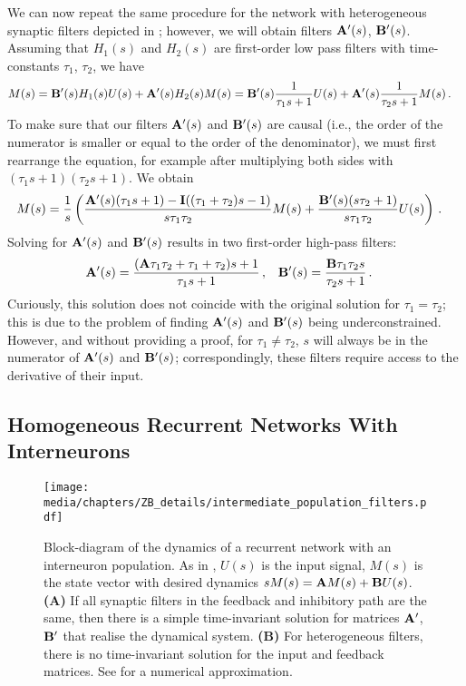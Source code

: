We can now repeat the same procedure for the network with heterogeneous synaptic filters depicted in ; however, we will obtain filters $\mathbf{A}'(s)$, $\mathbf{B}'(s)$.
Assuming that $H_1(s)$ and $H_2(s)$ are first-order low pass filters with time-constants $\tau_1$, $\tau_2$, we have
\begin{align*}
	M(s) &= \mathbf{B}'(s) H_1(s) U(s) + \mathbf{A}'(s) H_2(s) M(s) = \mathbf{B}'(s) \frac{1}{\tau_1 s + 1} U(s) + \mathbf{A}'(s) \frac{1}{\tau_2 s + 1} M(s) \,.
	\label{eqn:hetero_dyn}
\end{align*}
To make sure that our filters $\mathbf{A}'(s)$ and $\mathbf{B}'(s)$ are causal (i.e., the order of the numerator is smaller or equal to the order of the denominator), we must first rearrange the equation, for example after multiplying both sides with $(\tau_1 s + 1) (\tau_2 s + 1)$.
We obtain
\begin{align*}
	M(s) &= \frac{1}{s} \left(
		  \frac{ \mathbf{A}'(s) (\tau_1 s + 1) - \mathbf{I} ((\tau_1 + \tau_2) s - 1 )}{s \tau_1 \tau_2} M(s)
		+ \frac{\mathbf{B}'(s) (s \tau_2 + 1)}{s \tau_1 \tau_2} U(s)
	\right) \,.
\end{align*}
Solving for $\mathbf{A}'(s)$ and $\mathbf{B}'(s)$ results in two first-order high-pass filters:
\begin{align*}
	\mathbf{A}'(s) &= \frac{(\mathbf{A} \tau_1 \tau_2 + \tau_1 + \tau_2) s + 1}{\tau_1 s + 1} \,, &
	\mathbf{B}'(s) &= \frac{\mathbf{B} \tau_1 \tau_2 s}{\tau_2 s + 1} \,.
\end{align*}
Curiously, this solution does not coincide with the original \NEF solution for $\tau_1 = \tau_2$; this is due to the problem of finding $\mathbf{A}'(s)$ and $\mathbf{B}'(s)$ being underconstrained.
However, and without providing a proof, for $\tau_1 \neq \tau_2$, $s$ will always be in the numerator of $\mathbf{A}'(s)$ and $\mathbf{B}'(s)$; correspondingly, these filters require access to the derivative of their input.

\subsection{Homogeneous Recurrent Networks With Interneurons}
\label{app:granule_golgi_dynamics}

\begin{figure}
	\centering
	\texttt{[image: media/chapters/ZB\_details/intermediate\_population\_filters.pdf]}
	{\label{fig:intermediate_population_filters_a}}%
	{\label{fig:intermediate_population_filters_b}}%
	\caption[Block-diagram of recurrent networks with an interneuron population]{Block-diagram of the dynamics of a recurrent network with an interneuron population. As in , $U(s)$ is the input signal, $M(s)$ is the state vector with desired dynamics $s M(s) = \mathbf{A} M(s) + \mathbf{B} U(s)$.
	\textbf{(A)} If all synaptic filters in the feedback and inhibitory path are the same, then there is a simple time-invariant solution for matrices $\mathbf{A}'$, $\mathbf{B}'$ that realise the dynamical system.
	\textbf{(B)} For heterogeneous filters, there is no time-invariant solution for the input and feedback matrices. See  for a numerical approximation.}
\end{figure}


